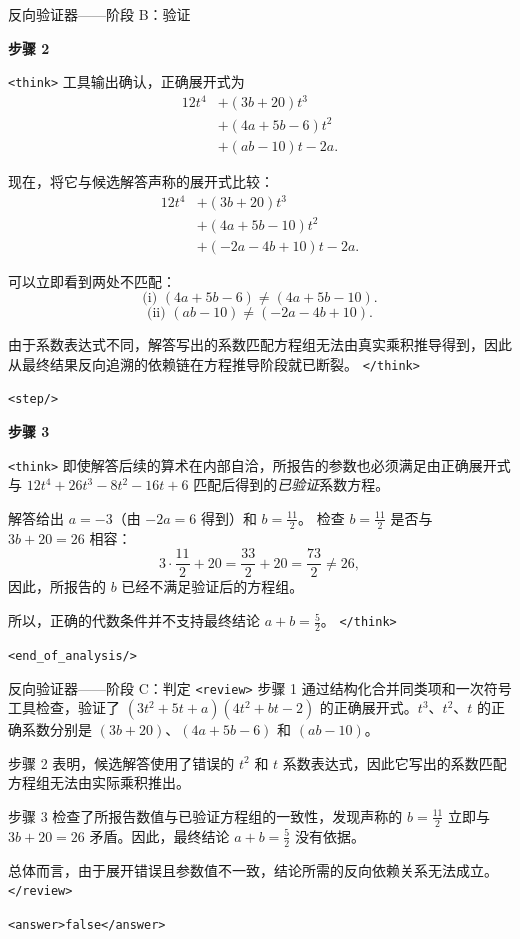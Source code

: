 \documentclass[11pt]{article}
\begin{document}
\begin{exbox}{反向验证器——阶段 B：验证}

\textbf{步骤 2}

\texttt{<think>}
工具输出确认，正确展开式为
\[
\begin{aligned}
12t^4
&+ (3b+20)t^3 \\
&+ (4a+5b-6)t^2 \\
&+ (ab-10)t - 2a.
\end{aligned}
\]

现在，将它与候选解答声称的展开式比较：
\[
\begin{aligned}
12t^4
&+ (3b+20)t^3 \\
&+ (4a+5b-10)t^2 \\
&+ (-2a-4b+10)t - 2a.
\end{aligned}
\]

可以立即看到两处不匹配：
\[
\text{(i) } (4a+5b-6)\neq(4a+5b-10).
\]
\[
\text{(ii) } (ab-10)\neq(-2a-4b+10).
\]

由于系数表达式不同，解答写出的系数匹配方程组无法由真实乘积推导得到，因此从最终结果反向追溯的依赖链在方程推导阶段就已断裂。
\texttt{</think>}

\texttt{<step/>}

\textbf{步骤 3}

\texttt{<think>}
即使解答后续的算术在内部自洽，所报告的参数也必须满足由正确展开式与 $12t^4+26t^3-8t^2-16t+6$ 匹配后得到的\emph{已验证}系数方程。

解答给出 $a=-3$（由 $-2a=6$ 得到）和 $b=\frac{11}{2}$。
检查 $b=\frac{11}{2}$ 是否与 $3b+20=26$ 相容：
\[
3\cdot\frac{11}{2}+20=\frac{33}{2}+20=\frac{73}{2}\neq 26,
\]
因此，所报告的 $b$ 已经不满足验证后的方程组。

所以，正确的代数条件并不支持最终结论 $a+b=\frac{5}{2}$。
\texttt{</think>}

\texttt{<end\_of\_analysis/>}
\end{exbox}

\begin{exbox}{反向验证器——阶段 C：判定}
\texttt{<review>}
步骤 1 通过结构化合并同类项和一次符号工具检查，验证了 $(3t^2+5t+a)(4t^2+bt-2)$ 的正确展开式。$t^3$、$t^2$、$t$ 的正确系数分别是 $(3b+20)$、$(4a+5b-6)$ 和 $(ab-10)$。

步骤 2 表明，候选解答使用了错误的 $t^2$ 和 $t$ 系数表达式，因此它写出的系数匹配方程组无法由实际乘积推出。

步骤 3 检查了所报告数值与已验证方程组的一致性，发现声称的 $b=\frac{11}{2}$ 立即与 $3b+20=26$ 矛盾。因此，最终结论 $a+b=\frac{5}{2}$ 没有依据。

总体而言，由于展开错误且参数值不一致，结论所需的反向依赖关系无法成立。
\texttt{</review>}

\texttt{<answer>false</answer>}
\end{exbox}
\end{document}
